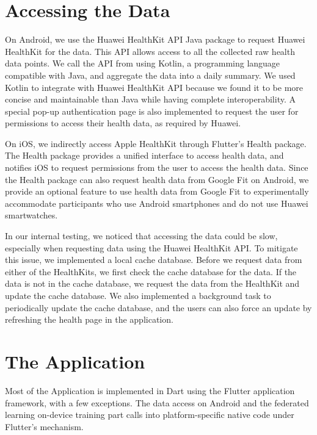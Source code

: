 \section{Accessing the Data}

On Android, we use the Huawei HealthKit API Java package to request
Huawei HealthKit for the data.
This API allows access to all the collected raw health data points.
We call the API from using Kotlin,
a programming language compatible with Java,
and aggregate the data into a daily summary.
We used Kotlin to integrate with Huawei HealthKit API because
we found it to be more concise and maintainable than Java while
having complete interoperability.
A special pop-up authentication page is also implemented to request the user for
permissions to access their health data, as required by Huawei.

On iOS, we indirectly access Apple HealthKit through Flutter's Health package.
The Health package provides a unified interface to access health data,
and notifies iOS to request permissions from the user to access the health data.
Since the Health package can also request health data from Google Fit on
Android, we provide an optional feature to use health data from Google Fit to
experimentally accommodate participants who use Android smartphones and
do not use Huawei smartwatches.

In our internal testing, we noticed that accessing the data could be slow,
especially when requesting data using the Huawei HealthKit API.
To mitigate this issue, we implemented a local cache database.
Before we request data from either of the HealthKits,
we first check the cache database for the data.
If the data is not in the cache database,
we request the data from the HealthKit and update the cache database.
We also implemented a background task to periodically update the cache database,
and the users can also force an update by refreshing the health page in
the application.

\section{The \fedcampus Application}

Most of the \fedcampus Application is implemented in Dart using
the Flutter application framework, with a few exceptions.
The data access on Android and the federated learning on-device training part
calls into platform-specific native code under Flutter's mechanism.

